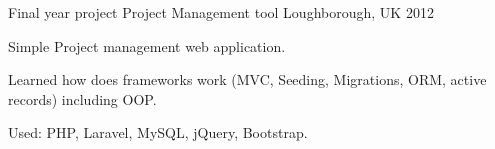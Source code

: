 \begin{cventries}
  \cventry
    {Final year project} %
    {Project Management tool} %
    {Loughborough, UK} %
    {2012} %
    {
      \begin{cvitems} %
        \item {Simple Project management web application.}
        \item {Learned how does frameworks work (MVC, Seeding, Migrations, ORM, active records) including OOP.}
        \item {Used: PHP, Laravel, MySQL, jQuery, Bootstrap.}
      \end{cvitems}
    }
\end{cventries}
